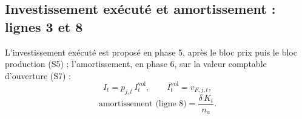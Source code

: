 \documentclass[11pt,a4paper]{article}
\begin{document}
\subsection{Investissement exécuté et amortissement : lignes 3 et 8}
\label{sec:investissement-lignes}
\begin{proposee}
L'investissement exécuté est proposé en phase 5, après le bloc prix puis le bloc production (S5) ; l'amortissement, en phase 6, sur la valeur comptable d'ouverture (S7) :
\begin{equation*}
I_t = p_{j,t}\, I^{\mathrm{vol}}_t, \qquad I^{\mathrm{vol}}_t = v_{F,j,t}, \tag{S5}
\end{equation*}
\begin{equation*}
\text{amortissement (ligne 8)} = \frac{\delta\, K_t}{n_a} . \tag{S7}
\end{equation*}


\end{proposee}
\end{document}
